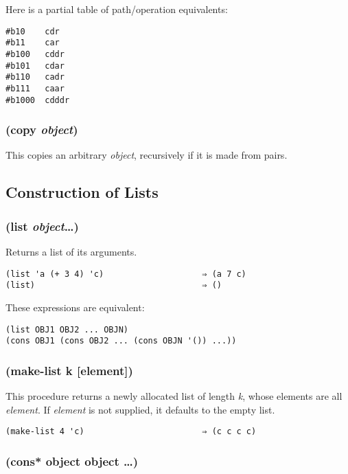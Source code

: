 \documentclass{article}
\begin{document}
Here is a partial table of path/operation equivalents:

\begin{verbatim}
#b10    cdr
#b11    car
#b100   cddr
#b101   cdar
#b110   cadr
#b111   caar
#b1000  cdddr
\end{verbatim}

\subsubsection{(copy \emph{object})}

This copies an arbitrary \emph{object}, recursively if it is made from pairs.

\subsection{Construction of Lists}\label{sec:construction-of-lists}

\subsubsection{(list \emph{object}\ldots{})}

Returns a list of its arguments.

\begin{verbatim}
(list 'a (+ 3 4) 'c)                    ⇒ (a 7 c)
(list)                                  ⇒ ()
\end{verbatim}

These expressions are equivalent:

\begin{verbatim}
(list OBJ1 OBJ2 ... OBJN)
(cons OBJ1 (cons OBJ2 ... (cons OBJN '()) ...))
\end{verbatim}

\subsubsection{(make-list k [element])}

This procedure returns a newly allocated list of length \emph{k}, whose elements are all
\emph{element}. If \emph{element} is not supplied, it defaults to the empty list.

\begin{verbatim}
(make-list 4 'c)                        ⇒ (c c c c)
\end{verbatim}

\subsubsection{(cons* object object \ldots{})}
\end{document}
